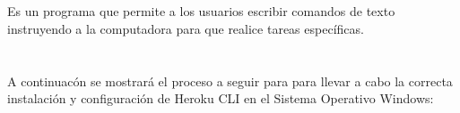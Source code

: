 \documentclass[10pt,a4paper]{article} %
\begin{document}
	\subsection{ }
	{\large Es un programa que permite a los usuarios escribir comandos de texto instruyendo a la computadora para que realice tareas espec{\'i}ficas.}
	
	\pagebreak
	
	\section{\color{colorIPN}{Desarrollo}}
	{\large A continuac{\'o}n se mostrar{\'a} el proceso a seguir para para llevar a cabo la correcta instalaci{\' o}n y configuraci{\' o}n de Heroku CLI en el Sistema Operativo Windows:}
	
\end{document}
